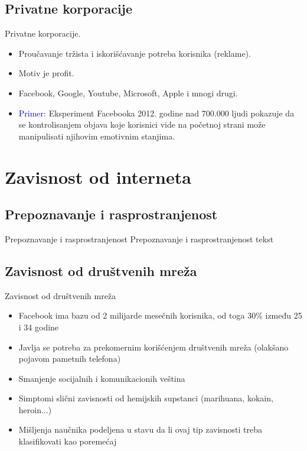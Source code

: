 \documentclass{beamer}
\begin{document}
			\subsection*{Privatne korporacije}
			\begin{frame}{Privatne korporacije.}
			\begin{itemize}
				\item Proučavanje tržista i iskorišćavanje potreba korisnika (reklame).
				\item Motiv je profit.
				\item Facebook, Google, Youtube, Microsoft, Apple i mnogi drugi.
				\item \textcolor{blue}{Primer:} Eksperiment Facebooka 2012. godine nad 700.000 ljudi pokazuje da se kontrolisanjem objava koje korisnici vide na početnoj strani može manipulisati njihovim emotivnim stanjima.
			 \end{itemize}
			\end{frame}		
		
	\section{Zavisnost od interneta}
		\subsection*{Prepoznavanje i rasprostranjenost}
		\begin{frame}{Prepoznavanje i rasprostranjenost}
				Prepoznavanje i rasprostranjenost tekst
		\end{frame}
	
		\subsection*{Zavisnost od društvenih mreža}
			\begin{frame}{Zavisnost od društvenih mreža}
				\begin{itemize}
				\item Facebook ima bazu od 2 milijarde mesečnih korisnika, od toga 30\% između 25 i 34 godine
				\item Javlja se potreba za prekomernim korišćenjem društvenih mreža (olakšano pojavom pametnih telefona)
				\item Smanjenje socijalnih i komunikacionih veština
				\item Simptomi slični zavisnosti od hemijskih supstanci (marihuana, kokain, heroin...)
				\item Mišljenja naučnika podeljena u stavu da li ovaj tip zavisnosti treba klasifikovati kao poremećaj
				\end{itemize}
			\end{frame}
\end{document}
